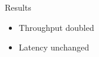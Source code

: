 
\begin{frame}{Results}
\begin{itemize}
\item Throughput doubled
\item Latency unchanged
\end{itemize}
\end{frame}
